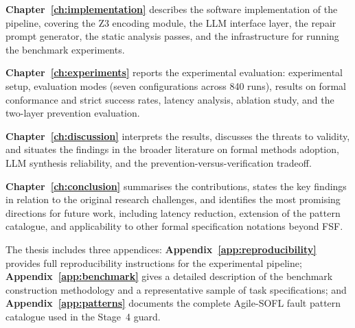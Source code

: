 \textbf{Chapter~\ref{ch:implementation}} describes the software implementation of the pipeline, covering the Z3 encoding module, the LLM interface layer, the repair prompt generator, the static analysis passes, and the infrastructure for running the benchmark experiments.

\textbf{Chapter~\ref{ch:experiments}} reports the experimental evaluation: experimental setup, evaluation modes (seven configurations across 840 runs), results on formal conformance and strict success rates, latency analysis, ablation study, and the two-layer prevention evaluation.

\textbf{Chapter~\ref{ch:discussion}} interprets the results, discusses the threats to validity, and situates the findings in the broader literature on formal methods adoption, LLM synthesis reliability, and the prevention-versus-verification tradeoff.

\textbf{Chapter~\ref{ch:conclusion}} summarises the contributions, states the key findings in relation to the original research challenges, and identifies the most promising directions for future work, including latency reduction, extension of the pattern catalogue, and applicability to other formal specification notations beyond FSF.

The thesis includes three appendices: \textbf{Appendix~\ref{app:reproducibility}} provides full reproducibility instructions for the experimental pipeline; \textbf{Appendix~\ref{app:benchmark}} gives a detailed description of the benchmark construction methodology and a representative sample of task specifications; and \textbf{Appendix~\ref{app:patterns}} documents the complete Agile-SOFL fault pattern catalogue used in the Stage~4 guard.
